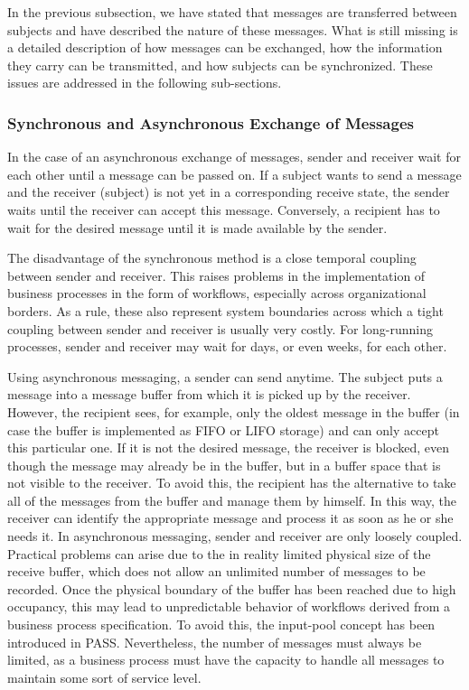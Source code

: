 In the previous subsection, we have stated that messages are transferred between subjects and have described the nature of these messages. What is still missing is a detailed description of how messages can be exchanged, how the information they carry can be transmitted, and how subjects can be synchronized. These issues are addressed in the following sub-sections.

\subsubsection{Synchronous and Asynchronous Exchange of Messages}

In the case of an asynchronous exchange of messages, sender and receiver wait for each other until a message can be passed on. If a subject wants to send a message and the receiver (subject) is not yet in a corresponding receive state, the sender waits until the receiver can accept this message. Conversely, a recipient has to wait for the desired message until it is made available by the sender.

The disadvantage of the synchronous method is a close temporal coupling between sender and receiver. This raises problems in the implementation of business processes in the form of workflows, especially across organizational borders. As a rule, these also represent system boundaries across which a tight coupling between sender and receiver is usually very costly. For long-running processes, sender and receiver may wait for days, or even weeks, for each other.

Using asynchronous messaging, a sender can send anytime. The subject puts a message into a message buffer from which it is picked up by the receiver. However, the recipient sees, for example, only the oldest message in the buffer (in case the buffer is implemented as FIFO or LIFO storage) and can only accept this particular one. If it is not the desired message, the receiver is blocked, even though the message may already be in the buffer, but in a buffer space that is not visible to the receiver. To avoid this, the recipient has the alternative to take all of the messages from the buffer and manage them by himself. In this way, the receiver can identify the appropriate message and process it as soon as he or she needs it. In asynchronous messaging, sender and receiver are only loosely coupled. Practical problems can arise due to the in reality limited physical size of the receive buffer, which does not allow an unlimited number of messages to be recorded. Once the physical boundary of the buffer has been reached due to high occupancy, this may lead to unpredictable behavior of workflows derived from a business process specification. To avoid this, the input-pool concept has been introduced in PASS. Nevertheless, the number of messages must always be limited, as a business process must have the capacity to handle all messages to maintain some sort of service level.


